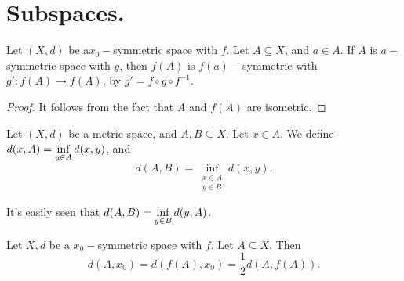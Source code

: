 \documentclass{amsart}
\begin{document}
\section{Subspaces.} %
\begin{corollary}
	Let \((X,d)\) be a\(x_0-\)symmetric space with \(f\).
	Let \(A \subseteq X\), and \(a \in A\).
	If \(A\) is \(a-\)symmetric space with \(g\), then \(f(A)\) is \(f(a)-\)symmetric with \(g':f(A) \longrightarrow f(A)\), by \(g' = f \circ g \circ f^{-1}\).
\end{corollary}
\begin{proof}
	It follows from the fact that \(A\) and \(f(A)\) are isometric.
\end{proof}
\begin{definition}
	Let \((X,d)\) be a metric space, and \(A,B \subseteq X\).
	Let \(x \in A\).
	We define \(d(x,A) = \displaystyle \inf _{y \in A} d(x,y)\), and
	\[
		d(A,B) = \inf _{\substack{x \in A \\ y \in B}} d(x,y). 
	\]
\end{definition}
It's easily seen that \(d(A,B) = \displaystyle \inf _{y \in B} d(y,A)\).
\begin{theorem}
	Let \(X,d\) be a \(x_0-\)symmetric space with \(f\).
	Let \(A \subseteq X\).
	Then
	\[
		d(A,x_0) = d(f(A) , x_0) = \dfrac{1}{2} d(A,f(A)).
	\]
\end{theorem}
\end{document}
